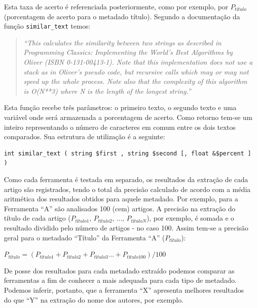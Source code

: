 Esta taxa de acerto é referenciada posteriormente, como por exemplo, por $P_{título}$ (porcentagem de acerto para o metadado título). Segundo a documentação da função \texttt{similar\_text} temos:

\begin{quote}
    \emph{``This calculates the similarity between two strings as described in Programming Classics: Implementing the World's Best Algorithms by Oliver (ISBN 0-131-00413-1). Note that this implementation does not use a stack as in Oliver's pseudo code, but recursive calls which may or may not speed up the whole process. Note also that the complexity of this algorithm is O(N**3) where N is the length of the longest string.''}
\end{quote}

Esta função recebe três parâmetros: o primeiro texto, o segundo texto e uma variável onde será armazenada a porcentagem de acerto. Como retorno tem-se um inteiro representando o número de caracteres em comum entre os dois textos comparados. Sua estrutura de utilização é a seguinte:

\lstset{language=PHP}
\begin{lstlisting}[escapechar=\#]
int similar_text ( string $first , string $second [, float &$percent ] )
\end{lstlisting}

Como cada ferramenta é testada em separado, os resultados da extração de cada artigo são registrados, tendo o total da precisão calculado de acordo com a média aritmética dos resultados obtidos para aquele metadado. Por exemplo, para a Ferramenta ``A'' são analisados 100 (cem) artigos. A precisão na extração do título de cada artigo ($P_{título1}$, $P_{título2}$, ..., $P_{títuloN}$), por exemplo, é somada e o resultado dividido pelo número de artigos - no caso 100. Assim tem-se a precisão geral para o metadado ``Título'' da Ferramenta ``A'' ($P_{título}$):

\begin{center}
    \begin{math}
        P_{título} = (P_{título1} + P_{título2} + P_{título3} ... + P_{título100}) / 100
        \label{math:result-by-metadata}
    \end{math}
\end{center}

De posse dos resultados para cada metadado extraído podemos comparar as ferramentas a fim de conhecer a mais adequada para cada tipo de metadado. Podemos inferir, portanto, que a ferramenta ``X'' apresenta melhores resultados do que ``Y'' na extração do nome dos autores, por exemplo.

